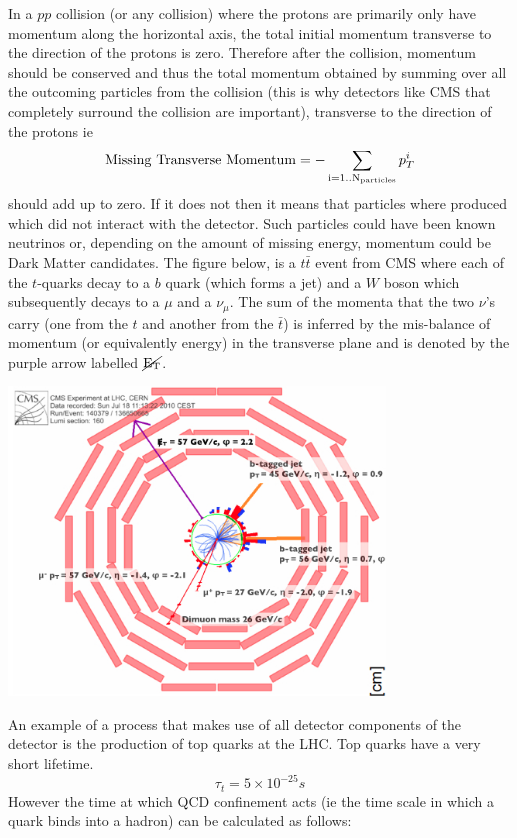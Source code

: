 In a $pp$ collision (or any collision) where the protons are primarily only have momentum along the horizontal axis, the total initial momentum transverse to the direction of the protons is zero. Therefore after the collision, momentum should be conserved and thus the total momentum obtained by summing over all the outcoming particles from the collision (this is why detectors like CMS that completely surround the collision are important), transverse to the direction of the protons ie 
\[{\rm Missing\,\,Transverse\,\,Momentum}=-\sum_{\rm i=1..N_{\rm particles}} p_{T}^{i}\]
should add up to zero. If it does not then it means that particles where produced which did not interact with the detector. Such particles could have been known neutrinos or, depending on the amount of missing energy, momentum could be Dark Matter candidates.
The figure below, is a $t\bar{t}$ event from CMS where each of the $t$-quarks decay to a $b$ quark (which forms a jet) and a $W$ boson which subsequently decays to a $\mu$ and a $\nu_{\mu}$. The sum of the momenta that the two $\nu$'s carry (one from the $t$ and another from the $\bar{t}$) is inferred by the mis-balance of momentum (or equivalently energy) in the transverse plane and is denoted by the purple arrow labelled $\cancel{\rm E_{T}}$.
\begin{center}
\includegraphics[width=0.75\textwidth]{fig/detector/met_cms.png}
\end{center}

An example of a process that makes use of all detector components of the detector is the production of top quarks at the LHC. Top quarks have a very short lifetime. 
\[\tau_{t}=5\times 10^{-25}s\]
However the time at which QCD confinement acts (ie the time scale in which a quark binds into a hadron) can be calculated as follows:

